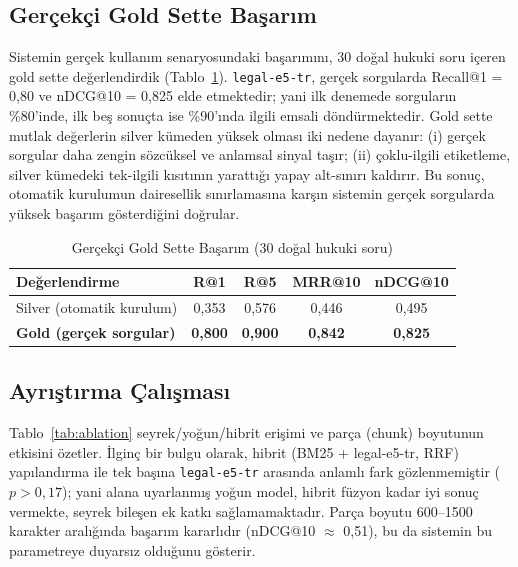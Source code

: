\documentclass[conference]{IEEEtran}
\begin{document}
\subsection{Gerçekçi Gold Sette Başarım}
Sistemin gerçek kullanım senaryosundaki başarımını, 30 doğal hukuki soru içeren gold sette değerlendirdik (Tablo~\ref{tab:gold}). \texttt{legal-e5-tr}, gerçek sorgularda Recall@1 = 0,80 ve nDCG@10 = 0,825 elde etmektedir; yani ilk denemede sorguların \%80'inde, ilk beş sonuçta ise \%90'ında ilgili emsali döndürmektedir. Gold sette mutlak değerlerin silver kümeden yüksek olması iki nedene dayanır: (i) gerçek sorgular daha zengin sözcüksel ve anlamsal sinyal taşır; (ii) çoklu-ilgili etiketleme, silver kümedeki tek-ilgili kısıtının yarattığı yapay alt-sınırı kaldırır. Bu sonuç, otomatik kurulumun dairesellik sınırlamasına karşın sistemin gerçek sorgularda yüksek başarım gösterdiğini doğrular.

\begin{table}[t]
\caption{Gerçekçi Gold Sette Başarım (30 doğal hukuki soru)}
\label{tab:gold}
\centering
\begin{tabular}{lcccc}
\toprule
Değerlendirme & R@1 & R@5 & MRR@10 & nDCG@10 \\
\midrule
Silver (otomatik kurulum) & 0,353 & 0,576 & 0,446 & 0,495 \\
\textbf{Gold (gerçek sorgular)} & \textbf{0,800} & \textbf{0,900} & \textbf{0,842} & \textbf{0,825} \\
\bottomrule
\end{tabular}
\end{table}

\subsection{Ayrıştırma Çalışması}
Tablo~\ref{tab:ablation} seyrek/yoğun/hibrit erişimi ve parça (chunk) boyutunun etkisini özetler. İlginç bir bulgu olarak, hibrit (BM25 + legal-e5-tr, RRF) yapılandırma ile tek başına \texttt{legal-e5-tr} arasında anlamlı fark gözlenmemiştir ($p>0{,}17$); yani alana uyarlanmış yoğun model, hibrit füzyon kadar iyi sonuç vermekte, seyrek bileşen ek katkı sağlamamaktadır. Parça boyutu 600--1500 karakter aralığında başarım kararlıdır (nDCG@10 $\approx$ 0,51), bu da sistemin bu parametreye duyarsız olduğunu gösterir.
\end{document}
